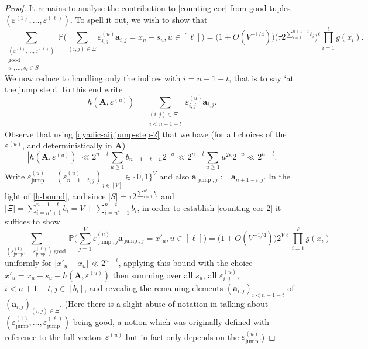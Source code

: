 \documentclass[11pt,reqno]{amsart}
\numberwithin{equation}{section}
\theoremstyle{definition}
\theoremstyle{remark}
\newcommand{\mb}{\mathbb}
\newcommand{\mbf}{\mathbf}
\newcommand{\eps}{\varepsilon}
\renewcommand{\ge}{\geqslant}
\newcommand\jump{\operatorname{jump}}
\begin{document}
\begin{proof}
It remains to analyse the contribution to \cref{counting-cor} from good tuples $(\eps^{(1)},\dots, \eps^{(\ell)})$. To spell it out, we wish to show that 
\begin{equation}\label{counting-cor-2} \sum_{\substack{(\eps^{(1)}, \dots, \eps^{(\ell)}) \\  \operatorname{good}\\ s_1,\dots, s_{\ell} \in S}} \mb{P} \Big(\sum_{(i,j) \in \Xi} \eps^{(u)}_{i,j} \mbf{a}_{i,j} = x_u - s_u, u \in [\ell]\Big) = \big(1 + O(V^{-1/4})\big) \Big( \tau 2^{\sum_{i =1}^{n + 1 - t} b_i}\Big)^{\ell}\prod_{i = 1}^{\ell} g(x_i).\end{equation}
We now reduce to handling only the indices with $i = n + 1 -t$, that is to say `at the jump step'. To this end write 
\[ h(\mbf{A},\eps^{(u)}) = \sum_{\substack{(i,j) \in \Xi \\ i < n + 1 - t}} \eps_{i,j}^{(u)} \mbf{a}_{i,j}.\] 
Observe that using \cref{dyadic-aij,jump-step-2} that we have (for all choices of the $\eps^{(u)}$, and deterministically in $\mbf{A}$)
\begin{equation}\label{h-bound} |h(\mbf{A},\eps^{(u)})| \ll 2^{n - t}\sum_{u \ge 1} b_{n + 1 - t - u} 2^{- u}  \ll 2^{n - t} \sum_{u \ge 1} u^{2\kappa}2^{-u} \ll 2^{n - t}.\end{equation} 
Write $\eps_{\jump}^{(u)} = (\eps_{n + 1 - t,j}^{(u)})_{j \in [V]} \in \{0,1\}^V$ and also $\mbf{a}_{\jump, j} := \mbf{a}_{n+ 1 - t,j}$. In the light of \cref{h-bound}, and since $|S| = \tau 2^{\sum_{i =1}^{n'} b_i}$ and $|\Xi| = \sum_{i = n' + 1}^{n + 1 - t} b_i = V + \sum_{i = n' + 1}^{n -t} b_i$, in order to establish \cref{counting-cor-2} it suffices to show 
\begin{equation}\label{counting-cor-3} \sum_{(\eps_{\jump}^{(1)}, \dots, \eps_{\jump}^{(\ell)})  \operatorname{good}}\mb{P}\Big( \sum_{j = 1}^V \eps_{\jump,j}^{(u)} \mbf{a}_{\jump,j} = x'_u, u \in [\ell]  \Big) = \big(1 + O(V^{-1/4})\big) 2^{V\ell} \prod_{i=1}^{\ell} g(x_i) \end{equation} uniformly for $|x'_u - x_u| \ll  2^{n - t}$, applying this bound with the choice $x'_u = x_u - s_u - h(\mbf{A},\eps^{(u)})$ then summing over all $s_u$, all $\eps_{i,j}^{(u)}$, $i < n + 1 - t, j \in [b_i]$, and revealing the remaining elements $(\mbf{a}_{i,j})_{i < n + 1 - t}$ of $(\mbf{a}_{i,j})_{(i,j) \in \Xi}$. (Here there is a slight abuse of notation in talking about $(\eps_{\jump}^{(1)}, \dots ,\eps_{\jump}^{(\ell)})$ being good, a notion which was originally defined with reference to the full vectors $\eps^{(u)}$ but in fact only depends on the $\eps_{\jump}^{(u)}$.)


\end{proof}
\end{document}
